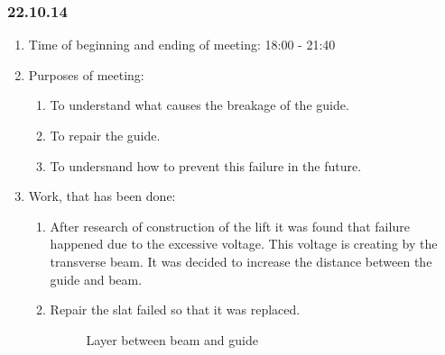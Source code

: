 \subsubsection{22.10.14}

\begin{enumerate}
	\item Time of beginning and ending of meeting:
	18:00 - 21:40
	\item Purposes of meeting:
	\begin{enumerate}
	  \item To understand what causes the breakage of the guide.
	  
	  \item To repair the guide.
	  
	  \item To undersnand how to prevent this failure in the future.
	  
    \end{enumerate}
    
	\item Work, that has been done:
	\begin{enumerate}
	  \item After research of construction of the lift it was found that failure happened due to the excessive voltage. This voltage is creating by the transverse beam. It was decided to increase the distance between the guide and beam.
      
      \item Repair the slat failed so that it was replaced.
      
      \begin{figure}[H]
      	\begin{minipage}[h]{1\linewidth}
      		\caption{Layer between beam and guide}
      	\end{minipage}
      \end{figure}
      

\end{enumerate}
\end{enumerate}
